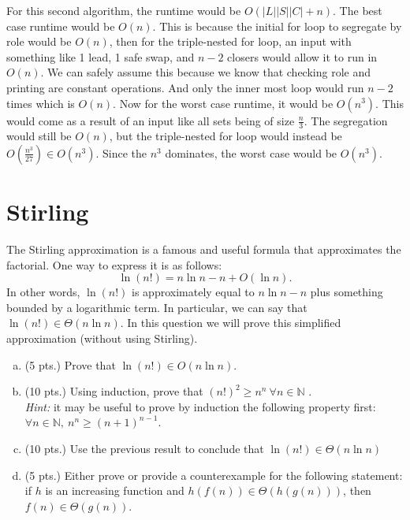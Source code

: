 \documentclass[letterpaper,11pt]{article}
\theoremstyle{plain}
\theoremstyle{definition}
\begin{document}
{\begin{enumerate}[a)]
    For this second algorithm, the runtime would be $O(|L||S||C| + n)$. The best case runtime would be $O(n)$. This is because the initial for loop to segregate by role would be $O(n)$, then for the triple-nested for loop, an input with something like 1 lead, 1 safe swap, and $n-2$ closers would allow it to run in $O(n)$. We can safely assume this because we know that checking role and printing are constant operations. And only the inner most loop would run $n-2$ times which is $O(n)$. Now for the worst case runtime, it would be $O(n^3)$. This would come as a result of an input like all sets being of size $\frac n3$. The segregation would still be $O(n)$, but the triple-nested for loop would instead be $O(\frac{n^3}{27}) \in O(n^3)$. Since the $n^3$ dominates, the worst case would be $O(n^3)$.
    \end{enumerate}
}
\newpage

\section{Stirling}
The Stirling approximation is a famous and useful formula that approximates the factorial. One way to express it is as follows:
$$\ln (n!) = n\ln n - n+O(\ln n).$$
In other words, $\ln(n!)$ is approximately equal to $n\ln n - n$ plus something bounded by a  logarithmic term. In particular, we can say that $\ln(n!) \in \Theta(n \ln n)$. In this question we will prove this simplified approximation (without using Stirling).  
\begin{enumerate}[a)]
    \item (5 pts.) Prove that $\ln (n!) \in O(n\ln n)$. \\
    \color{blue}

    
    \color{black}
    \item (10 pts.) Using induction, prove that $(n!)^2\geq n^n \ \forall n\in \mathbb{N}$ . \\
    \emph{Hint:} it may be useful to prove by induction the following property first: $\forall n \in \mathbb{N}, \ n^n \geq (n+1)^{n-1}$.\\
    \color{blue}
    
    \color{black}
    \item (10 pts.) Use the previous result to conclude that $\ln (n!) \in \Theta(n\ln n)$\\
    \color{blue}

 

    
    \color{black}
    \item (5 pts.) Either prove or provide a counterexample for the following statement: if $h$ is an increasing function and $h(f(n))\in \Theta(h(g(n)))$, then $f(n)\in \Theta(g(n))$. \\
    \color{blue}
    \color{black}
\end{enumerate}
\newpage
\end{document}
